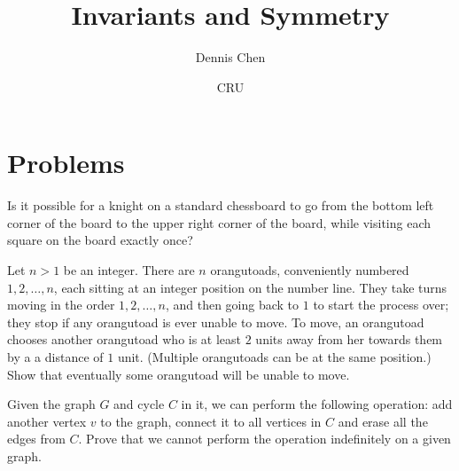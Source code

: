 \documentclass{article}
\title{Invariants and Symmetry}
\author{Dennis Chen}
\date{CRU}
\begin{document}
\maketitle



\pagebreak

\section{Problems}



\begin{prob}{2}
Is it possible for a knight on a standard chessboard to go from the bottom left corner of the board to the upper right corner of the board, while visiting each square on the board exactly once?
\end{prob}

\begin{prob}[USAMTS 2019]{2}
Let $n>1$ be an integer. There are $n$ orangutoads, conveniently numbered $1,2,\dots{},n$, each sitting at an integer position on the number line. They take turns moving in the order $1,2,\dots{},n$, and then going back to $1$ to start the process over; they stop if any orangutoad is ever unable to move. To move, an orangutoad chooses another orangutoad who is at least $2$ units away from her towards them by a a distance of $1$ unit. (Multiple orangutoads can be at the same position.) Show that eventually some orangutoad will be unable to move.
\end{prob}

\begin{req}[PUMaC 2020]{2}
Given the graph $G$ and cycle $C$ in it, we can perform the following operation: add another vertex $v$ to the graph, connect it to all vertices in $C$ and erase all the edges from $C.$ Prove that we cannot perform the operation indefinitely on a given graph.
\end{req}
\end{document}
